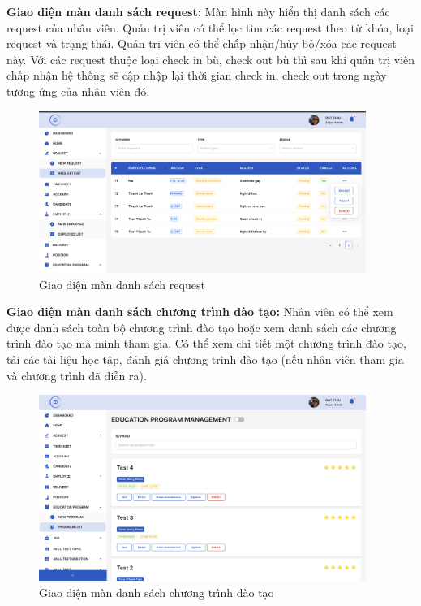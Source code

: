 \documentclass[../DoAn.tex]{subfiles}
\begin{document}
\textbf{Giao diện màn danh sách request:}
Màn hình này hiển thị danh sách các request của nhân viên. Quản trị viên có thể lọc tìm các request theo từ khóa, loại request và trạng thái. Quản trị viên có thể chấp nhận/hủy bỏ/xóa các request này. Với các request thuộc loại check in bù, check out bù thì sau khi quản trị viên chấp nhận hệ thống sẽ cập nhập lại thời gian check in, check out trong ngày tương ứng của nhân viên đó.
\begin{figure}[H]
    \centering
    \includegraphics[width=0.95\textwidth]{Hinhve/DanhSachRequest.png}
    \caption{Giao diện màn danh sách request}
\end{figure}

\textbf{Giao diện màn danh sách chương trình đào tạo:}
Nhân viên có thể xem được danh sách toàn bộ chương trình đào tạo hoặc xem danh sách các chương trình đào tạo mà mình tham gia. Có thể xem chi tiết một chương trình đào tạo, tải các tài liệu học tập, đánh giá chương trình đào tạo (nếu nhân viên tham gia và chương trình đã diễn ra).
\begin{figure}[H]
    \centering
    \includegraphics[width=0.95\textwidth]{Hinhve/QuanLyChuongTrinhDT.png}
    \caption{Giao diện màn danh sách chương trình đào tạo}
\end{figure}
\end{document}
